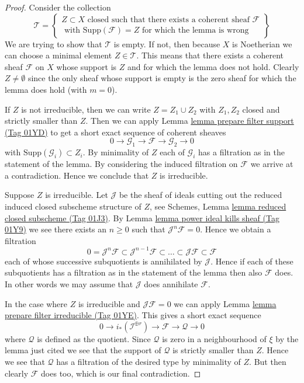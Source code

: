 \documentclass{amsart}
\theoremstyle{plain}
\theoremstyle{definition}
\theoremstyle{remark}
\numberwithin{equation}{subsection}
\begin{document}
\begin{proof}
Consider the collection
$$
\mathcal{T} =
\left\{
\begin{matrix}
Z \subset X
\text{ closed such that there exists a coherent sheaf }
\mathcal{F} \\
\text{ with }
\text{Supp}(\mathcal{F}) = Z
\text{ for which the lemma is wrong}
\end{matrix}
\right\}
$$
We are trying to show that $\mathcal{T}$ is empty. If not, then
because $X$ is Noetherian we can choose a minimal element
$Z \in \mathcal{T}$. This means that there exists a coherent
sheaf $\mathcal{F}$ on $X$ whose support is $Z$ and for which the
lemma does not hold. Clearly $Z \not = \emptyset$ since the only
sheaf whose support is empty is the zero sheaf for which the
lemma does hold (with $m = 0$).

\medskip\noindent
If $Z$ is not irreducible, then we can write $Z = Z_1 \cup Z_2$
with $Z_1, Z_2$ closed and strictly smaller than $Z$.
Then we can apply Lemma \href{https://stacks.math.columbia.edu/tag/01YD}{lemma prepare filter support (Tag 01YD)}
to get a short exact sequence of coherent sheaves
$$
0 \to
\mathcal{G}_1 \to
\mathcal{F} \to
\mathcal{G}_2 \to 0
$$
with $\text{Supp}(\mathcal{G}_i) \subset Z_i$. By minimality of
$Z$ each of $\mathcal{G}_i$ has a filtration as in the statement
of the lemma. By considering the induced filtration on $\mathcal{F}$
we arrive at a contradiction. Hence we conclude
that $Z$ is irreducible.

\medskip\noindent
Suppose $Z$ is irreducible. Let $\mathcal{J}$ be the sheaf of ideals
cutting out the reduced induced closed subscheme structure of $Z$,
see Schemes, Lemma \href{https://stacks.math.columbia.edu/tag/01J3}{lemma reduced closed subscheme (Tag 01J3)}.
By Lemma \href{https://stacks.math.columbia.edu/tag/01Y9}{lemma power ideal kills sheaf (Tag 01Y9)} we see there exists
an $n \geq 0$ such that $\mathcal{J}^n\mathcal{F} = 0$. Hence we obtain
a filtration
$$
0 = \mathcal{J}^n\mathcal{F} \subset \mathcal{J}^{n - 1}\mathcal{F}
\subset \ldots \subset \mathcal{J}\mathcal{F} \subset \mathcal{F}
$$
each of whose successive subquotients is annihilated by $\mathcal{J}$.
Hence if each of these subquotients has a filtration as in the statement
of the lemma then also $\mathcal{F}$ does. In other words we may
assume that $\mathcal{J}$ does annihilate $\mathcal{F}$.

\medskip\noindent
In the case where $Z$ is irreducible and $\mathcal{J}\mathcal{F} = 0$
we can apply Lemma \href{https://stacks.math.columbia.edu/tag/01YE}{lemma prepare filter irreducible (Tag 01YE)}.
This gives a short exact sequence
$$
0 \to
i_*(\mathcal{I}^{\oplus r}) \to
\mathcal{F} \to
\mathcal{Q} \to 0
$$
where $\mathcal{Q}$ is defined as the quotient.
Since $\mathcal{Q}$ is zero in a neighbourhood of $\xi$ by
the lemma just cited we see that the support of $\mathcal{Q}$
is strictly smaller than $Z$. Hence we see that $\mathcal{Q}$
has a filtration of the desired type by minimality of $Z$.
But then clearly $\mathcal{F}$ does too, which is our final contradiction.
\end{proof}
\end{document}
